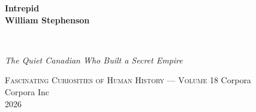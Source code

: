 \clearpage
\vspace*{1.5in}
\begin{center}
  \begin{minipage}{\textwidth}
    \centering
    \Huge\bfseries
    \linespread{1.25}\selectfont
    Intrepid\\[0.5em]
    William Stephenson
  \end{minipage}
  \\[3em]
  {\Large\itshape\linespread{1.3}\selectfont
  The Quiet Canadian Who Built a Secret Empire\par}
  \vspace{2em}
  {\small\scshape Fascinating Curiosities of Human History — Volume 18}
  \vfill
  {\large Corpora}
  \\[1em]
  {\large Corpora Inc}
  \\[1em]
  {\large 2026}
\end{center}
\clearpage
